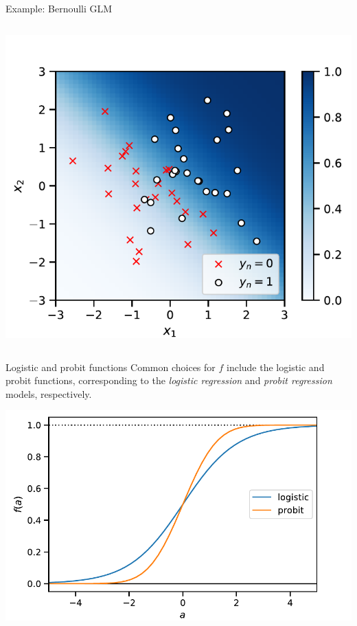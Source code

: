 \documentclass[aspectratio=169]{beamer}
\begin{document}
\begin{frame}{Example: Bernoulli GLM}
\begin{columns}
\begin{column}{.5\textwidth}
\includegraphics[width=1.\linewidth]{figures/lap2/data.pdf}
\end{column}

\end{columns}
\end{frame}

\begin{frame}{Logistic and probit functions}
Common choices for $f$ include the logistic and probit functions, corresponding to the \emph{logistic regression} and \emph{probit regression} models, respectively.

\centering
\includegraphics[width=.7\textwidth]{figures/lap2/logistic_probit.pdf}
\end{frame}
\end{document}
